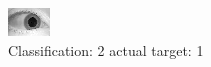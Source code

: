 \begin{figure}[h!]
\begin{center}
\includegraphics[width=0.60\columnwidth]{figures/ID1592_class_2_target_1.png}
\end{center}
\caption{ Classification: 2 actual target: 1}
\label{fig:ID1592_class_2_target_1}
\end{figure}
